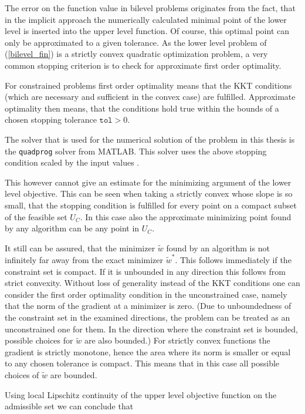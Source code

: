The error on the function value in bilevel problems originates from the fact, that in the implicit approach the numerically calculated minimal point of the lower level is inserted into the upper level function.
Of course, this optimal point can only be approximated to a given tolerance.
As the lower level problem of (\ref{bilevel_fin}) is a strictly convex quadratic optimization problem, a very common stopping criterion is to check for approximate first order optimality.

For constrained problems first order optimality means that the KKT conditions (which are necessary and sufficient in the convex case) are fulfilled.
Approximate optimality then means, that the conditions hold true within the bounds of a chosen stopping tolerance \(\mathtt{tol}
 >0\).

The solver that is used for the numerical solution of the problem in this thesis is the \texttt{quadprog} solver from MATLAB. This solver uses the above stopping condition scaled by the input values \cite{2017}.

This  however cannot give an estimate for the minimizing argument of the lower level objective.
This can be seen when taking a strictly convex whose slope is so small, that the stopping condition is fulfilled for every point on a compact subset of the feasible set \(U_C\).
In this case also the approximate minimizing point found by any algorithm can be any point in \(U_C\). 

It still can be assured, that the minimizer \(\tilde{w}\) found by an algorithm is not infinitely far away from the exact minimizer \(\tilde{w}^*\).
This follows immediately if the constraint set is compact. If it is unbounded in any direction this follows from strict convexity.
Without loss of generality instead of the KKT conditions one can consider the first order optimality condition in the unconstrained case, namely that the norm of the gradient at a minimizer is zero. (Due to unboundedness of the constraint set in the examined directions, the problem can be treated as an unconstrained one for them. In the direction where the constraint set is bounded, possible choices for \(\tilde{w}\) are also bounded.)
For strictly convex functions the gradient is strictly monotone, hence the area where its norm is smaller or equal to any chosen tolerance is compact. This means that in this case all possible choices of \(\tilde{w}\) are bounded.

Using local Lipschitz continuity of the upper level objective function on the admissible set we can conclude that

